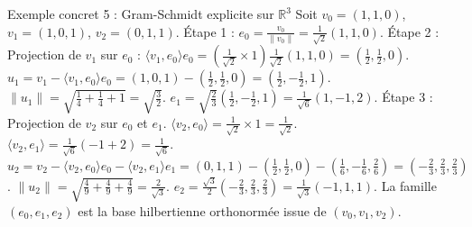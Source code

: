 \documentclass[11pt,a4paper]{article}
\begin{document}
\begin{center}
\end{center}

\textit{}Exemple concret 5 : Gram-Schmidt explicite sur $\mathbb{R}^3$\textit{}
Soit $v_0 = (1, 1, 0)$, $v_1 = (1, 0, 1)$, $v_2 = (0, 1, 1)$.
Étape 1 : $e_0 = \frac{v_0}{\|v_0\|} = \frac{1}{\sqrt{2}}(1, 1, 0)$.
Étape 2 : Projection de $v_1$ sur $e_0$ : $\langle v_1, e_0 \rangle e_0 = (\frac{1}{\sqrt{2}} \times 1) \frac{1}{\sqrt{2}}(1, 1, 0) = (\frac{1}{2}, \frac{1}{2}, 0)$.
$u_1 = v_1 - \langle v_1, e_0 \rangle e_0 = (1, 0, 1) - (\frac{1}{2}, \frac{1}{2}, 0) = (\frac{1}{2}, -\frac{1}{2}, 1)$.
$\|u_1\| = \sqrt{\frac{1}{4} + \frac{1}{4} + 1} = \sqrt{\frac{3}{2}}$.
$e_1 = \sqrt{\frac{2}{3}}(\frac{1}{2}, -\frac{1}{2}, 1) = \frac{1}{\sqrt{6}}(1, -1, 2)$.
Étape 3 : Projection de $v_2$ sur $e_0$ et $e_1$.
$\langle v_2, e_0 \rangle = \frac{1}{\sqrt{2}} \times 1 = \frac{1}{\sqrt{2}}$.
$\langle v_2, e_1 \rangle = \frac{1}{\sqrt{6}} (-1 + 2) = \frac{1}{\sqrt{6}}$.
$u_2 = v_2 - \langle v_2, e_0 \rangle e_0 - \langle v_2, e_1 \rangle e_1 = (0, 1, 1) - (\frac{1}{2}, \frac{1}{2}, 0) - (\frac{1}{6}, -\frac{1}{6}, \frac{2}{6}) = (-\frac{2}{3}, \frac{2}{3}, \frac{2}{3})$.
$\|u_2\| = \sqrt{\frac{4}{9} + \frac{4}{9} + \frac{4}{9}} = \frac{2}{\sqrt{3}}$.
$e_2 = \frac{\sqrt{3}}{2}(-\frac{2}{3}, \frac{2}{3}, \frac{2}{3}) = \frac{1}{\sqrt{3}}(-1, 1, 1)$.
La famille $(e_0, e_1, e_2)$ est la base hilbertienne orthonormée issue de $(v_0, v_1, v_2)$.
\end{document}
